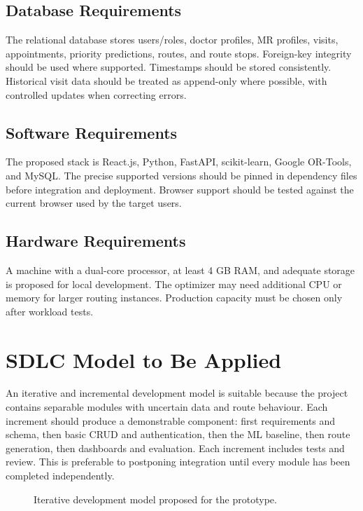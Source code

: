 \documentclass[12pt,a4paper,oneside]{report}
\begin{document}
\subsection{Database Requirements}
The relational database stores users/roles, doctor profiles, MR profiles, visits, appointments, priority predictions, routes, and route stops. Foreign-key integrity should be used where supported. Timestamps should be stored consistently. Historical visit data should be treated as append-only where possible, with controlled updates when correcting errors.

\subsection{Software Requirements}
The proposed stack is React.js, Python, FastAPI, scikit-learn, Google OR-Tools, and MySQL. The precise supported versions should be pinned in dependency files before integration and deployment. Browser support should be tested against the current browser used by the target users.

\subsection{Hardware Requirements}
A machine with a dual-core processor, at least 4 GB RAM, and adequate storage is proposed for local development. The optimizer may need additional CPU or memory for larger routing instances. Production capacity must be chosen only after workload tests.

\section{SDLC Model to Be Applied}
An iterative and incremental development model is suitable because the project contains separable modules with uncertain data and route behaviour. Each increment should produce a demonstrable component: first requirements and schema, then basic CRUD and authentication, then the ML baseline, then route generation, then dashboards and evaluation. Each increment includes tests and review. This is preferable to postponing integration until every module has been completed independently.

\begin{figure}[htbp]
\centering
{}
\caption{Iterative development model proposed for the prototype.}
\end{figure}
\end{document}
